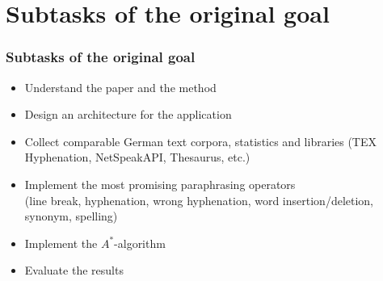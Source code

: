 \documentclass{beamer}
\begin{document}

\section{Subtasks of the original goal}
\begin{frame}
\frametitle{Subtasks of the original goal}
\begin{itemize}
	\item Understand the paper and the method
	\item Design an architecture for the application	
	\item Collect comparable German text corpora, statistics and libraries
	(TEX Hyphenation, NetSpeakAPI, Thesaurus, etc.)
	\item Implement the most promising paraphrasing operators\\
	(line break, hyphenation, wrong 
	hyphenation, word insertion/deletion, synonym, spelling)
	\item Implement the $A^*$-algorithm
	\item Evaluate the results
	
	
	
\end{itemize}
\end{frame}



\end{document}
